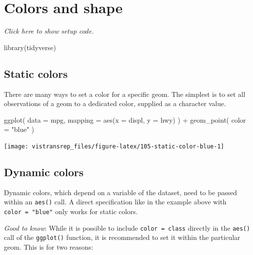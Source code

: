 \documentclass[]{book}
\newenvironment{Shaded}{}{}
\newcommand{\DataTypeTok}[1]{#1}
\newcommand{\KeywordTok}[1]{\textcolor[rgb]{0.00,0.00,1.00}{#1}}
\newcommand{\NormalTok}[1]{#1}
\newcommand{\OperatorTok}[1]{#1}
\newcommand{\StringTok}[1]{\textcolor[rgb]{0.00,0.50,0.50}{#1}}
\begin{document}
\hypertarget{colors-and-shape}{%
\section{Colors and shape}\label{colors-and-shape}}

\emph{Click here to show setup code.}

\begin{Shaded}
\begin{Highlighting}[]
\KeywordTok{library}\NormalTok{(tidyverse)}
\end{Highlighting}
\end{Shaded}

\hypertarget{static-colors}{%
\subsection{Static colors}\label{static-colors}}

There are many ways to set a color for a specific geom.
The simplest is to set all observations of a geom to a dedicated color, supplied as a character value.

\begin{Shaded}
\begin{Highlighting}[]
\KeywordTok{ggplot}\NormalTok{(}
  \DataTypeTok{data =}\NormalTok{ mpg,}
  \DataTypeTok{mapping =} \KeywordTok{aes}\NormalTok{(}\DataTypeTok{x =}\NormalTok{ displ, }\DataTypeTok{y =}\NormalTok{ hwy)}
\NormalTok{) }\OperatorTok{+}
\StringTok{  }\KeywordTok{geom_point}\NormalTok{(}
    \DataTypeTok{color =} \StringTok{"blue"}
\NormalTok{  )}
\end{Highlighting}
\end{Shaded}

\begin{flushright}\texttt{[image: vistransrep\_files/figure-latex/105-static-color-blue-1]} \end{flushright}

\hypertarget{dynamic-colors}{%
\subsection{Dynamic colors}\label{dynamic-colors}}

Dynamic colors, which depend on a variable of the dataset, need to be passed within an \texttt{aes()} call.
A direct specification like in the example above with \texttt{color\ =\ "blue"} only works for static colors.

\emph{Good to know}: While it is possible to include \texttt{color\ =\ class} directly in the \texttt{aes()} call of the \texttt{ggplot()} function, it is recommended to set it within the particular geom.
This is for two reasons:
\end{document}
